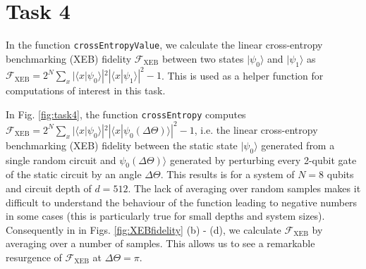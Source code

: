 \documentclass[12pt]{article}
\begin{document}
\section*{Task 4}
In the function \texttt{crossEntropyValue}, we calculate the linear cross-entropy benchmarking (XEB) fidelity $\mathcal{F}_\mathrm{XEB}$ between two states $|\psi_0\rangle$ and $|\psi_1\rangle$ as $\mathcal{F}_\mathrm{XEB} = 2^N \sum_{x} |\langle x|\psi_0\rangle|^2 |\langle x|\psi_1\rangle|^2 - 1$. This is used as a helper function for computations of interest in this task. 

In Fig. \ref{fig:task4}, the function \texttt{crossEntropy} computes $\mathcal{F}_\mathrm{XEB} = 2^N \sum_{x} |\langle x|\psi_0\rangle|^2 |\langle x|\psi_0(\Delta\Theta) \rangle|^2 - 1$, i.e. the linear cross-entropy benchmarking (XEB) fidelity between the static state $|\psi_0\rangle$ generated from a single random circuit and $\psi_0(\Delta \Theta)\rangle$ generated by perturbing every 2-qubit gate of the static circuit by an angle $\Delta \Theta$. This results is for a system of $N = 8$ qubits and circuit depth of $d = 512$. The lack of averaging over random samples makes it difficult to understand the behaviour of the function leading to negative numbers in some cases (this is particularly true for small depths and system sizes). Consequently in in Figs. \ref{fig:XEBfidelity} (b) - (d), we calculate $\mathcal{F}_\mathrm{XEB}$ by averaging over a number of samples. This allows us to see a remarkable resurgence of $\mathcal{F}_\mathrm{XEB}$ at $\Delta \Theta = \pi$.
\end{document}

